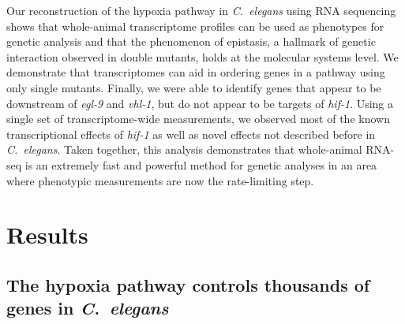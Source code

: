 \documentclass[9pt,twocolumn,twoside]{pnas-new}
\newcommand{\cel}{\emph{C.~elegans}}
\newcommand{\gene}[1]{\mbox{\emph{#1}}}
\begin{document}
Our reconstruction of the hypoxia pathway in \cel{} using RNA sequencing shows
that whole-animal transcriptome profiles can be used as phenotypes for genetic
analysis and that the phenomenon of epistasis, a hallmark of genetic interaction
observed in double mutants, holds at the molecular systems level. We demonstrate
that transcriptomes can aid in ordering genes in a pathway using only single
mutants. Finally, we were able to identify genes that appear to be downstream of
\gene{egl-9} and \gene{vhl-1}, but do not appear to be targets of \gene{hif-1}.
Using a single set of transcriptome-wide measurements, we observed most of the
known transcriptional effects of \gene{hif-1} as well as novel effects not
described before in \cel{}. Taken together, this analysis demonstrates that
whole-animal RNA-seq is an extremely fast and powerful method for genetic
analyses in an area where phenotypic measurements are now the rate-limiting
step.


\section*{Results}
\subsection*{The hypoxia pathway controls thousands of genes in \cel{}}
\label{sub:summary}
\end{document}
